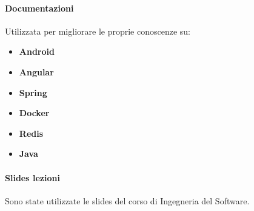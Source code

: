 \paragraph{Documentazioni}
Utilizzata per migliorare le proprie conoscenze su:
\begin{itemize}
	\item \textbf{Android}
	\item \textbf{Angular}
	\item \textbf{Spring}
	\item \textbf{Docker}
	\item \textbf{Redis}
	\item \textbf{Java}
\end{itemize}
\paragraph{Slides lezioni}
Sono state utilizzate le slides del corso di Ingegneria del Software. 
